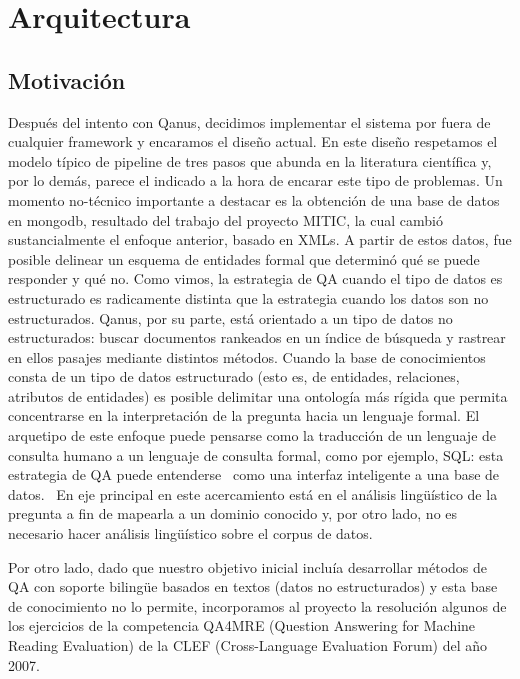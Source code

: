 \bigskip

\section{Arquitectura}

\subsection{Motivación}

Despu\'es del intento con Qanus, decidimos implementar el sistema por
fuera de cualquier framework y encaramos el dise\~no actual. En este
dise\~no respetamos el modelo t\'ipico de pipeline de tres pasos que
abunda en la literatura cient\'ifica y, por lo dem\'as, parece el
indicado a la hora de encarar este tipo de problemas. Un momento no-t\'ecnico
importante a destacar es la obtenci\'on de una base de datos en
mongodb, resultado del trabajo del proyecto MITIC, la cual cambi\'o
sustancialmente el enfoque anterior, basado en XMLs. 
A partir de estos datos, fue posible delinear un esquema de entidades formal que determin\'o
qu\'e se puede responder y qu\'e no. Como vimos, la estrategia de QA
cuando el tipo de datos es estructurado es radicamente distinta que la
estrategia cuando los datos son no estructurados. Qanus, por su parte,
est\'a orientado a un tipo de datos no estructurados: buscar documentos
rankeados en un \'indice de b\'usqueda y rastrear en ellos pasajes
mediante distintos m\'etodos. Cuando la base de conocimientos consta de
un tipo de datos estructurado (esto es, de entidades, relaciones,
atributos de entidades) es posible delimitar una ontolog\'ia m\'as
r\'igida que permita concentrarse en la interpretaci\'on de la pregunta
hacia un lenguaje formal. El arquetipo de este enfoque puede pensarse
como la traducci\'on de un lenguaje de consulta humano a un lenguaje de
consulta formal, como por ejemplo, SQL: esta estrategia de QA puede
entenderse \ como una interfaz inteligente a una base de datos. \ En
eje principal en este acercamiento est\'a en el an\'alisis
ling\"u\'istico de la pregunta a fin de mapearla a un dominio conocido
y, por otro lado, no es necesario hacer an\'alisis ling\"u\'istico
sobre el corpus de datos.

Por otro lado, dado que nuestro objetivo inicial inclu\'ia desarrollar
m\'etodos de QA con soporte bilingüe basados en textos (datos no estructurados) 
y esta base de conocimiento no lo permite, incorporamos al proyecto la resoluci\'on
algunos de los ejercicios de la competencia QA4MRE (Question Answering for Machine Reading Evaluation)
de la CLEF (Cross-Language Evaluation Forum) del a\~no 2007. 

